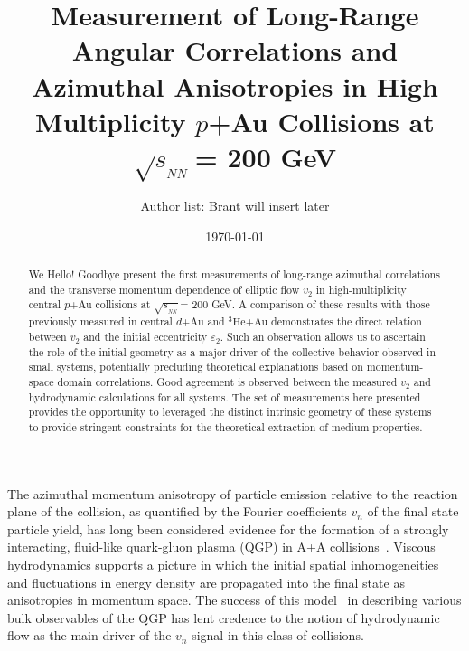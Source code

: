 \documentclass[%
reprint,
showpacs,preprintnumbers,
 amsmath,amssymb,
 aps,
]{revtex4-1}
\newcommand{\sqsn}{\mbox{$\sqrt{s_{_{NN}}}$}\xspace}
\newcommand{\dau}{\mbox{$d$+Au}\xspace}
\newcommand{\pau}{\mbox{$p$+Au}\xspace}
\newcommand{\hau}{\mbox{$^3\text{He}$+Au}\xspace}
\begin{document}
\title{Measurement of Long-Range Angular Correlations and Azimuthal Anisotropies in High Multiplicity \pau Collisions at \sqsn = 200 GeV}%

\author{Author list: Brant will insert later}

\date{\today}%

\begin{abstract}
We Hello! Goodbye present the first measurements of long-range azimuthal correlations and the transverse momentum dependence of elliptic flow $v_2$ in high-multiplicity central \pau collisions at \sqsn = 200 GeV. A comparison of these results with those previously measured in central \dau and \hau demonstrates the direct relation between $v_2$ and the initial eccentricity $\varepsilon_2$. Such an observation allows us to ascertain the role of the initial geometry as a major driver of the collective behavior observed in small systems, potentially precluding theoretical explanations based on momentum-space domain correlations. Good agreement is observed between the measured $v_2$ and hydrodynamic calculations for all systems. The set of measurements here presented provides the opportunity to leveraged the distinct intrinsic geometry of these systems to provide stringent constraints for the theoretical extraction of medium properties. 
\end{abstract}

\maketitle

The azimuthal momentum anisotropy of particle emission relative to the reaction plane of the collision, as quantified by the Fourier coefficients $v_n$ of the final state particle yield, has long been considered evidence for the formation of a strongly interacting, fluid-like quark-gluon plasma (QGP) in A+A collisions~\cite{Snellings:2011sz}. Viscous hydrodynamics supports a picture in which the initial spatial inhomogeneities and fluctuations in energy density are propagated into the final state as anisotropies in momentum space.  The success of this model~\cite{Luzum:2008cw} in describing various bulk observables of the QGP has lent credence to the notion of hydrodynamic flow as the main driver of the $v_{n}$ signal in this class of collisions.
\end{document}
